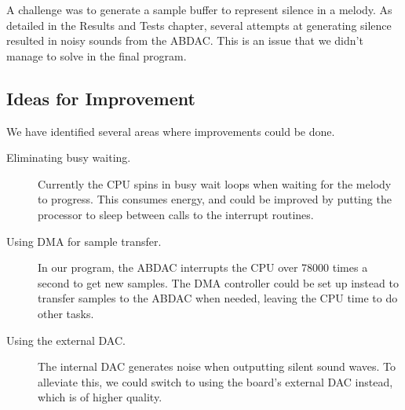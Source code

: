 A challenge was to generate a sample buffer to represent silence in a
melody. As detailed in the Results and Tests chapter, several attempts
at generating silence resulted in noisy sounds from the ABDAC. This is
an issue that we didn't manage to solve in the final program.

\subsection{Ideas for Improvement}

We have identified several areas where improvements could be done.

\begin{description}
    \item [Eliminating busy waiting.]
        Currently the CPU spins in busy wait loops when waiting for the
        melody to progress. This consumes energy, and could be improved
        by putting the processor to sleep between calls to the interrupt
        routines.
    \item [Using DMA for sample transfer.]
        In our program, the ABDAC interrupts the CPU over 78000 times a
        second to get new samples. The DMA controller could be set up
        instead to transfer samples to the ABDAC when needed, leaving
        the CPU time to do other tasks.
    \item [Using the external DAC.]
        The internal DAC generates noise when outputting silent sound
        waves. To alleviate this, we could switch to using the board's
        external DAC instead, which is of higher quality. \cite{comp}
\end{description}
